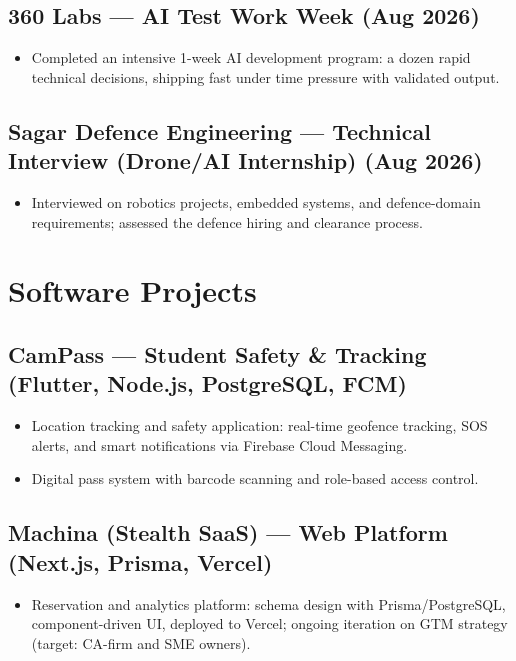 \documentclass[10pt]{article}
\begin{document}
\subsection{360 Labs --- AI Test Work Week \hfill (Aug 2026)}
\begin{itemize}
  \item Completed an intensive 1-week AI development program: a dozen rapid technical decisions, shipping fast under time pressure with validated output.
\end{itemize}

\subsection{Sagar Defence Engineering --- Technical Interview (Drone/AI Internship) \hfill (Aug 2026)}
\begin{itemize}
  \item Interviewed on robotics projects, embedded systems, and defence-domain requirements; assessed the defence hiring and clearance process.
\end{itemize}

\section{Software Projects}

\subsection{CamPass --- Student Safety \& Tracking \hfill (Flutter, Node.js, PostgreSQL, FCM)}
\begin{itemize}
  \item Location tracking and safety application: real-time geofence tracking, SOS alerts, and smart notifications via Firebase Cloud Messaging.
  \item Digital pass system with barcode scanning and role-based access control.
\end{itemize}

\subsection{Machina (Stealth SaaS) --- Web Platform \hfill (Next.js, Prisma, Vercel)}
\begin{itemize}
  \item Reservation and analytics platform: schema design with Prisma/PostgreSQL, component-driven UI, deployed to Vercel; ongoing iteration on GTM strategy (target: CA-firm and SME owners).
\end{itemize}
\end{document}
